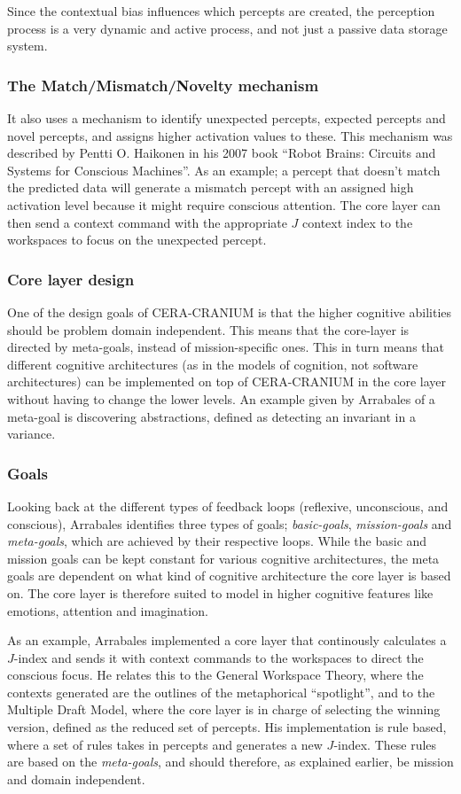 Since the contextual bias influences which percepts are created, the perception
process is a very dynamic and active process, and not just a passive data
storage system.

\subsubsection{The Match/Mismatch/Novelty mechanism}
It also uses a mechanism to identify unexpected percepts, expected percepts and
novel percepts, and assigns higher activation values to these. This mechanism
was described by Pentti O. Haikonen in his 2007 book ``Robot Brains: Circuits
and Systems for Conscious Machines''\cite{haikonen2007robotbrains}. As an
example; a percept that doesn't match the predicted data will generate a
mismatch percept with an assigned high activation level because it might
require conscious attention. The core layer can then send a context command
with the appropriate $J$ context index to the workspaces to focus on the
unexpected percept.

\subsubsection{Core layer design}
One of the design goals of CERA-CRANIUM is that the higher cognitive abilities
should be problem domain independent.\cite{Arrabales2009} This means that the
core-layer is directed by meta-goals, instead of mission-specific ones. This
in turn means that different cognitive architectures (as in the models of
cognition, not software architectures) can be implemented on top of
CERA-CRANIUM in the core layer without having to change the lower levels. An
example given by Arrabales of a meta-goal is discovering abstractions, defined
as detecting an invariant in a variance.

\subsubsection{Goals}
Looking back at the different types of feedback loops (reflexive, unconscious,
and conscious), Arrabales identifies three types of goals;
\textit{basic-goals}, \textit{mission-goals} and \textit{meta-goals}, which are
achieved by their respective loops. While the basic and mission goals can be
kept constant for various cognitive architectures, the meta goals are dependent
on what kind of cognitive architecture the core layer is based on. The core
layer is therefore suited to model in higher cognitive features like emotions,
attention and imagination.

As an example, Arrabales implemented a core layer that continously calculates
a $J$-index and sends it with context commands to the workspaces to direct the
conscious focus. He relates this to the General Workspace Theory, where the
contexts generated are the outlines of the metaphorical ``spotlight'', and to
the Multiple Draft Model, where the core layer is in charge of selecting the
winning version, defined as the reduced set of percepts. His implementation is
rule based, where a set of rules takes in percepts and generates a new
$J$-index. These rules are based on the \textit{meta-goals}, and should
therefore, as explained earlier, be mission and domain independent.